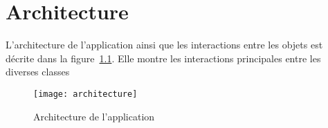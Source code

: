 \chapter{Architecture}

L'architecture de l'application ainsi que les interactions entre les objets est décrite dans la figure~\ref{fig:architecture}. Elle montre les interactions principales entre les diverses classes

\begin{figure}[htb]
\centering 
\texttt{[image: architecture]}
\caption[Architecture de l'application]{Architecture de l'application}
\label{fig:architecture}
\end{figure}
